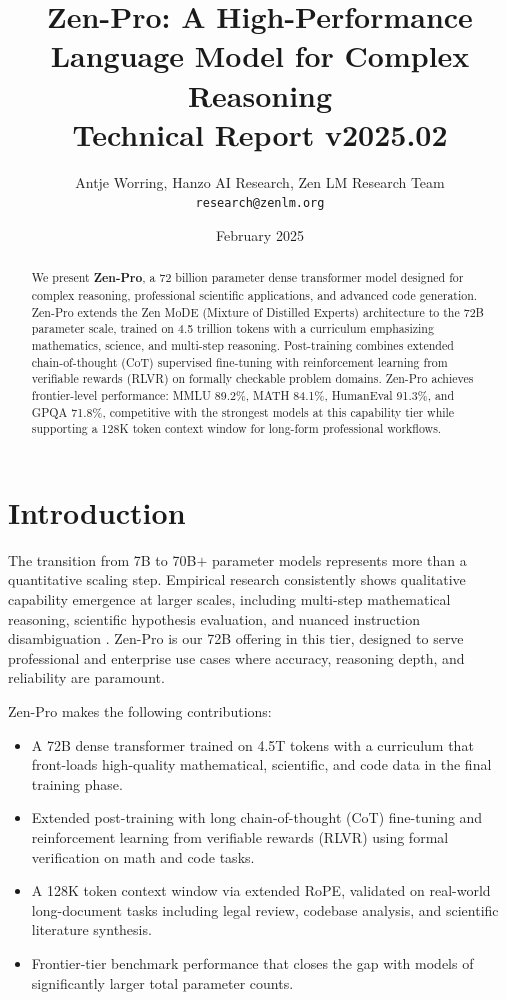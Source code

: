 \documentclass[11pt,a4paper]{article}
\title{\textbf{Zen-Pro: A High-Performance Language Model for Complex Reasoning}\\
\large Technical Report v2025.02}
\author{Antje Worring, Hanzo AI Research, Zen LM Research Team\\
\texttt{research@zenlm.org}}
\date{February 2025}
\begin{document}
\maketitle

\begin{abstract}
We present \textbf{Zen-Pro}, a 72 billion parameter dense transformer model designed for complex
reasoning, professional scientific applications, and advanced code generation. Zen-Pro extends the
Zen MoDE (Mixture of Distilled Experts) architecture to the 72B parameter scale, trained on
4.5 trillion tokens with a curriculum emphasizing mathematics, science, and multi-step reasoning.
Post-training combines extended chain-of-thought (CoT) supervised fine-tuning with reinforcement
learning from verifiable rewards (RLVR) on formally checkable problem domains. Zen-Pro achieves
frontier-level performance: MMLU 89.2\%, MATH 84.1\%, HumanEval 91.3\%, and GPQA 71.8\%,
competitive with the strongest models at this capability tier while supporting a 128K token
context window for long-form professional workflows.
\end{abstract}

\tableofcontents
\newpage

\section{Introduction}

The transition from 7B to 70B$+$ parameter models represents more than a quantitative scaling
step. Empirical research consistently shows qualitative capability emergence at larger scales,
including multi-step mathematical reasoning, scientific hypothesis evaluation, and nuanced
instruction disambiguation \cite{wei2022emergent, srivastava2022beyond}. Zen-Pro is our 72B
offering in this tier, designed to serve professional and enterprise use cases where accuracy,
reasoning depth, and reliability are paramount.

Zen-Pro makes the following contributions:

\begin{itemize}
  \item A 72B dense transformer trained on 4.5T tokens with a curriculum that front-loads
        high-quality mathematical, scientific, and code data in the final training phase.
  \item Extended post-training with long chain-of-thought (CoT) fine-tuning and reinforcement
        learning from verifiable rewards (RLVR) using formal verification on math and code tasks.
  \item A 128K token context window via extended RoPE, validated on real-world long-document
        tasks including legal review, codebase analysis, and scientific literature synthesis.
  \item Frontier-tier benchmark performance that closes the gap with models of significantly
        larger total parameter counts.
\end{itemize}
\end{document}
